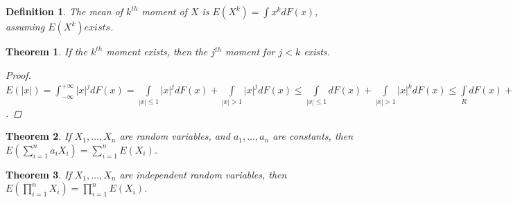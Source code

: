\documentclass[11pt]{article}
\newtheorem{theorem}{Theorem}[section]
\newtheorem{definition}{Definition}[section]
\begin{document}
\begin{definition}
The mean of $k^{th}$ moment of $X$ is $E(X^k)=\int x^kdF(x)$, assuming $E(X^k) exists$. 
\end{definition}
\begin{theorem}
If the $k^{th}$ moment exists, then the $j^{th}$ moment for $j<k$ exists.
\begin{proof}
$E(|x|)=\int_{-\infty}^{+\infty}|x|^jdF(x)=\int\limits_{|x|\le 1}|x|^jdF(x)+\int\limits_{|x|>1}|x|^jdF(x)\le\int\limits_{|x|\le 1}dF(x)+\int\limits_{|x|>1}|x|^kdF(x)\le\int\limits_RdF(x)+\int\limits_R|x|^kdF(x)=1+E(|x|^k)<\infty$.
\end{proof}
\end{theorem}
\begin{theorem}
If $X_1,\dots,X_n$ are random variables, and $a_1,\dots,a_n$ are constants, then $E(\sum_{i=1}^na_iX_i)=\sum_{i=1}^nE(X_i)$.
\end{theorem}
\begin{theorem}
If $X_1,\dots,X_n$ are independent random variables, then $E(\prod_{i=1}^nX_i)=\prod_{i=1}^nE(X_i)$.
\end{theorem}
\end{document}
